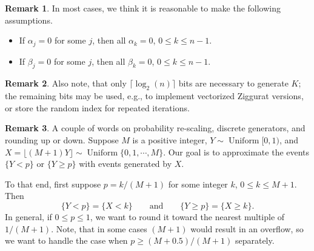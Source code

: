 \documentclass{article}
\renewcommand{\geq}{\geqslant}
\renewcommand{\leq}{\leqslant}
\theoremstyle{definition} %
\newtheorem{remark}{Remark}
\DeclareMathOperator{\DUnif}{\mathrm{Uniform}} %
\newcommand{\ceil}[1]{\lceil{#1}\rceil}
\newcommand{\floor}[1]{\lfloor{#1}\rfloor}
\begin{document}
\begin{remark}
    In most cases, we think it is reasonable to make the following assumptions.
    \begin{itemize}
        \item If $\alpha _j = 0$ for some $j$, then all $\alpha _k = 0$, $0 \leq k \leq n - 1$.
        \item If $\beta _j = 0$ for some $j$, then all $\beta _k = 0$, $0 \leq k \leq n - 1$.
    \end{itemize}
\end{remark}

\begin{remark}
    Also note, that only $\ceil{\log _2 (n)}$ bits are necessary to generate $K$; the remaining bits may be used, e.g., to implement vectorized Ziggurat versions, or store the random index for repeated iterations.
\end{remark}

\begin{remark}
    A couple of words on probability re-scaling, discrete generators, and rounding up or down.
    Suppose $M$ is a positive integer, $Y \sim \DUnif [0, 1)$, and $X = \floor{(M + 1) Y} \sim \DUnif \{ 0, 1, \cdots , M \}$. Our goal is to approximate the events $\{ Y < p \}$ or $\{ Y \geq p \}$ with events generated by $X$.
        
    To that end, first suppose $p = k / (M + 1)$ for some integer $k$, $0 \leq k \leq M + 1$. Then
    \[
        \{ Y < p \} = \{ X < k \}
        \qquad \text{and} \qquad
        \{ Y \geq p \} = \{ X \geq k \}.
    \]
    In general, if $0 \leq p \leq 1$, we want to round it toward the nearest multiple of $1 / (M + 1)$. Note, that in some cases $(M + 1)$ would result in an overflow, so we want to handle the case when $p \geq (M + 0.5) / (M + 1)$ separately.
\end{remark}



\end{document}
